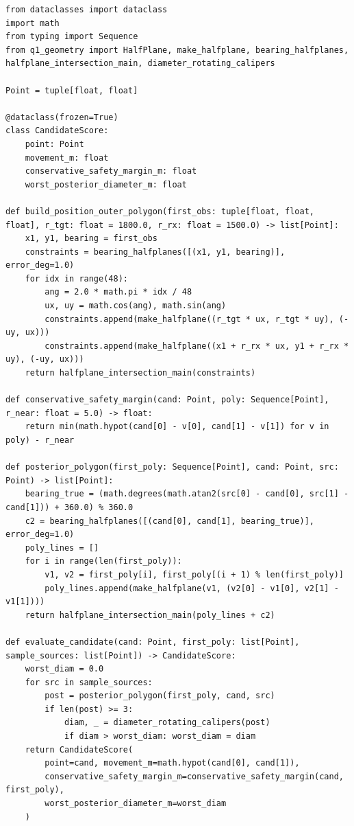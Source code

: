 \begin{lstlisting}[caption={问题二核心算法（q2\_fast.py）}]
from dataclasses import dataclass
import math
from typing import Sequence
from q1_geometry import HalfPlane, make_halfplane, bearing_halfplanes, halfplane_intersection_main, diameter_rotating_calipers

Point = tuple[float, float]

@dataclass(frozen=True)
class CandidateScore:
    point: Point
    movement_m: float
    conservative_safety_margin_m: float
    worst_posterior_diameter_m: float

def build_position_outer_polygon(first_obs: tuple[float, float, float], r_tgt: float = 1800.0, r_rx: float = 1500.0) -> list[Point]:
    x1, y1, bearing = first_obs
    constraints = bearing_halfplanes([(x1, y1, bearing)], error_deg=1.0)
    for idx in range(48):
        ang = 2.0 * math.pi * idx / 48
        ux, uy = math.cos(ang), math.sin(ang)
        constraints.append(make_halfplane((r_tgt * ux, r_tgt * uy), (-uy, ux)))
        constraints.append(make_halfplane((x1 + r_rx * ux, y1 + r_rx * uy), (-uy, ux)))
    return halfplane_intersection_main(constraints)

def conservative_safety_margin(cand: Point, poly: Sequence[Point], r_near: float = 5.0) -> float:
    return min(math.hypot(cand[0] - v[0], cand[1] - v[1]) for v in poly) - r_near

def posterior_polygon(first_poly: Sequence[Point], cand: Point, src: Point) -> list[Point]:
    bearing_true = (math.degrees(math.atan2(src[0] - cand[0], src[1] - cand[1])) + 360.0) % 360.0
    c2 = bearing_halfplanes([(cand[0], cand[1], bearing_true)], error_deg=1.0)
    poly_lines = []
    for i in range(len(first_poly)):
        v1, v2 = first_poly[i], first_poly[(i + 1) % len(first_poly)]
        poly_lines.append(make_halfplane(v1, (v2[0] - v1[0], v2[1] - v1[1])))
    return halfplane_intersection_main(poly_lines + c2)

def evaluate_candidate(cand: Point, first_poly: list[Point], sample_sources: list[Point]) -> CandidateScore:
    worst_diam = 0.0
    for src in sample_sources:
        post = posterior_polygon(first_poly, cand, src)
        if len(post) >= 3:
            diam, _ = diameter_rotating_calipers(post)
            if diam > worst_diam: worst_diam = diam
    return CandidateScore(
        point=cand, movement_m=math.hypot(cand[0], cand[1]),
        conservative_safety_margin_m=conservative_safety_margin(cand, first_poly),
        worst_posterior_diameter_m=worst_diam
    )
\end{lstlisting}


